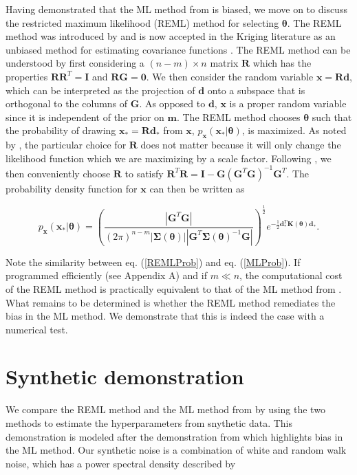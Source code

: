 \documentclass[10pt,a4paper]{article}
\begin{document}
Having demonstrated that the ML method from \citet{Langbein1997} is biased, we move on to discuss the restricted maximum likelihood (REML) method for selecting $\mathbf{\theta}$.  The REML method was introduced by \citet{Patterson1971} and is now accepted in the Kriging literature as an unbiased method for estimating covariance functions \citep[e.g.][]{Cressie1992}. The REML method can be understood by first considering a $(n-m)\times n$ matrix $\mathbf{R}$ which has the properties $\mathbf{R}\mathbf{R}^T = \mathbf{I}$ and $\mathbf{R}\mathbf{G}=\mathbf{0}$.  We then consider the random variable $\mathbf{x}=\mathbf{R}\mathbf{d}$, which can be interpreted as the projection of $\mathbf{d}$ onto a subspace that is orthogonal to the columns of $\mathbf{G}$. As opposed to $\mathbf{d}$, $\mathbf{x}$ is a proper random variable since it is independent of the prior on $\mathbf{m}$. The REML method chooses $\mathbf{\theta}$ such that the probability of drawing $\mathbf{x}_*=\mathbf{R}\mathbf{d}_*$ from $\mathbf{x}$, $p_\mathbf{x}(\mathbf{x}_*|\mathbf{\theta})$, is maximized. As noted by \citet{Harville1974}, the particular choice for $\mathbf{R}$ does not matter because it will only change the likelihood function which we are maximizing by a scale factor. Following \citet{Harville1974}, we then conveniently choose $\mathbf{R}$ to satisfy $\mathbf{R}^T\mathbf{R} = \mathbf{I} - \mathbf{G}(\mathbf{G}^T\mathbf{G})^{-1}\mathbf{G}^T$.  The probability density function for $\mathbf{x}$ can then be written as 

\begin{equation}\label{REMLProb}
p_\mathbf{x}(\mathbf{x}_*|\mathbf{\theta}) =
\left(\frac{\left|\mathbf{G}^T\mathbf{G}\right|}
           {(2\pi)^{n-m}
            \left| \mathbf{\Sigma}(\mathbf{\theta}) \right| 
            \left| \mathbf{G}^T\mathbf{\Sigma}(\mathbf{\theta})^{-1}\mathbf{G} \right|}\right)^{\frac{1}{2}} 
e^{-\tfrac{1}{2}\mathbf{d}_*^T\mathbf{K}(\mathbf{\theta})\mathbf{d}_*} .
\end{equation}

Note the similarity between eq. (\ref{REMLProb}) and eq. (\ref{MLProb}). If programmed efficiently (see Appendix A) and if $m \ll n$, the computational cost of the REML method is practically equivalent to that of the ML method from \citet{Langbein1997}. What remains to be determined is whether the REML method remediates the bias in the ML method. We demonstrate that this is indeed the case with a numerical test. 

\section{Synthetic demonstration}
We compare the REML method and the ML method from \citet{Langbein1997} by using the two methods to estimate the hyperparameters from snythetic data. This demonstration is modeled after the demonstration from \citet{Langbein2012} which highlights bias in the ML method. Our synthetic noise is a combination of white and random walk noise, which has a power spectral density described by
\end{document}

